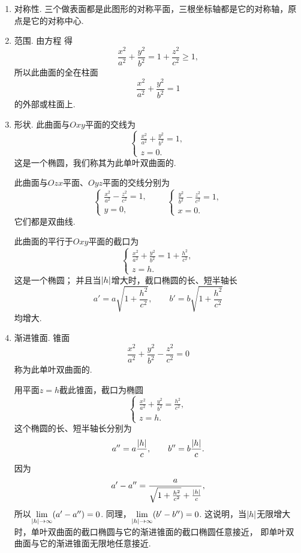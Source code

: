 \begin{enumerate}
	\item 对称性.
	三个做表面都是此图形的对称平面，三根坐标轴都是它的对称轴，原点是它的对称中心.

	\item 范围.
	由方程  得\[
		\frac{x^2}{a^2}+\frac{y^2}{b^2}=1+\frac{z^2}{c^2}\geq1,
	\]
	所以此曲面的全在柱面\[
		\frac{x^2}{a^2}+\frac{y^2}{b^2}=1
	\]的外部或柱面上.

	\item 形状.
	此曲面与\(Oxy\)平面的交线为\[
		\left\{ \begin{array}{l}
			\frac{x^2}{a^2}+\frac{y^2}{b^2}=1, \\
			z = 0.
		\end{array} \right.
	\]
	这是一个椭圆，我们称其为此单叶双曲面的.

	此曲面与\(Ozx\)平面、\(Oyz\)平面的交线分别为\[
		\left\{ \begin{array}{l}
			\frac{x^2}{a^2}-\frac{z^2}{c^2}=1, \\
			y = 0,
		\end{array} \right.
		\qquad
		\left\{ \begin{array}{l}
			\frac{y^2}{b^2}-\frac{z^2}{c^2}=1, \\
			x = 0.
		\end{array} \right.
	\]
	它们都是双曲线.

	此曲面的平行于\(Oxy\)平面的截口为\[
		\left\{ \begin{array}{l}
			\frac{x^2}{a^2}+\frac{y^2}{b^2}=1+\frac{h^2}{c^2}, \\
			z = h.
		\end{array} \right.
	\]
	这是一个椭圆；
	并且当\(\abs{h}\)增大时，截口椭圆的长、短半轴长\[
		a' = a \sqrt{1+\frac{h^2}{c^2}}, \qquad
		b' = b \sqrt{1+\frac{h^2}{c^2}}
	\]均增大.

	\item 渐进锥面.
	锥面\begin{equation}
		\frac{x^2}{a^2}+\frac{y^2}{b^2}-\frac{z^2}{c^2}=0
	\end{equation}
	称为此单叶双曲面的.

	用平面\(z=h\)截此锥面，截口为椭圆\[
		\left\{ \begin{array}{l}
			\frac{x^2}{a^2}+\frac{y^2}{b^2}=\frac{h^2}{c^2}, \\
			z = h.
		\end{array} \right.
	\]
	这个椭圆的长、短半轴长分别为\[
		a'' = a \frac{\abs{h}}{c}, \qquad
		b'' = b \frac{\abs{h}}{c}.
	\]
	因为\[
		a' - a'' = \frac{a}{\sqrt{1+\frac{h^2}{c^2}}+\frac{\abs{h}}{c}},
	\]
	所以\(\lim\limits_{\abs{h}\to\infty}(a'-a'')=0\).
	同理，\(\lim\limits_{\abs{h}\to\infty}(b'-b'')=0\).
	这说明，当\(\abs{h}\)无限增大时，单叶双曲面的截口椭圆与它的渐进锥面的截口椭圆任意接近，
	即单叶双曲面与它的渐进锥面无限地任意接近.
\end{enumerate}


